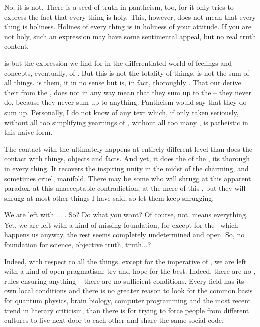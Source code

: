 No, it is not.  There is a seed of truth in pantheism, too, for it
only tries to express the fact that every thing is holy.  This,
however, does not mean that every
thing is holiness.  Holines of every thing is 
in holiness of your attitude.  If you are not holy, such an expression
may have some sentimental appeal, but no real truth content.

 is but the expression we find for  in
the differentiated world of feelings and concepts, eventually, of
.  But this  is not the totality of
things, is not the sum of all things.   is 
them, it in no sense  but is, in fact,
thoroughly .  That our  derive their
 from the , does not in any way mean that they
sum up to the  -- they never do, because they never sum up to
anything.  Pantheism would say that they do sum up. Personally, I do not know 
of any text which, if only taken seriously, without all too 
simplifying yearnings of , without all too 
many , is 
patheistic in this naive form.

The  contact with the ultimately 
happens at entirely different level than does the 
contact with things, objects and facts.  And yet, it does  the  of the , its thorough
 in every thing.  It recovers the inspiring unity in the
midst of the charming, and sometimes cruel, manifold.  There may be
some who will shrugg at this apparent paradox, at this unacceptable
contradiction, at the mere  of this , but they will shrugg at most other things I have
said, so let them keep shrugging.



\pa
We are left with ... . So? Do what you want? Of course,
not.  means everything. Yet, we are left with a kind of missing
foundation, for except for the \sch\ which happens  us anyway, the
rest seems completely undetermined and open. So, no foundation for science,
objective truth, truth...?

Indeed, with respect to all the  things, except for the imperative
of , we are left with a kind of open pragmatism: try and hope
for the best. Indeed, there are no ,  rules ensuring
anything -- there are no sufficient conditions. Every field has its own local
conditions and there is no greater reason to look for the common basis for
quantum physics, brain biology, computer programming and the most recent trend
in literary criticism, than there is for trying to force people from different
cultures to live next door to each other and share the same social code. 

